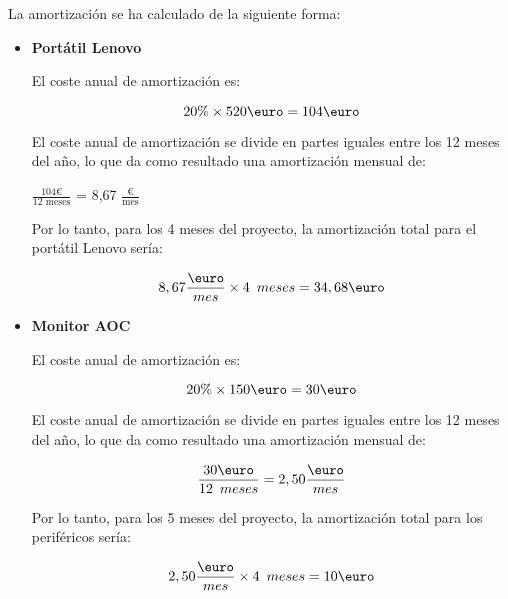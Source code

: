 \begin{itemize}
La amortización se ha calculado de la siguiente forma:
\begin{itemize}
    \item \textbf{Portátil Lenovo} 
    
El coste anual de amortización es: 
    \begin{center}
        $$ 20\% \times 520 \text{\euro} = 104 \text{\euro} $$
    \end{center}
    
El coste anual de amortización se divide en partes iguales entre los 12 meses del año, lo que da como resultado una amortización mensual de: 

    \begin{center}
       {\Large\(\frac{104\text{€}}{\text{12 meses}}\)} = 8,67 {\Large\(\frac{\text{€}}{\text{mes}}\)}
    \end{center}

Por lo tanto, para los 4 meses del proyecto, la amortización total para el portátil Lenovo sería: 

    \begin{center}
        $$ 8,67\frac{\text{\euro}}{mes}\times4\hspace{0.5em}meses=34,68\text{\euro}  $$
    \end{center}

    \item \textbf{Monitor AOC} 

    El coste anual de amortización es: 

    \begin{center}
        $$ 20\% \times 150 \text{\euro} = 30 \text{\euro} $$
    \end{center}
    
    El coste anual de amortización se divide en partes iguales entre los 12 meses del año, lo que da como resultado una amortización mensual de: 

    \begin{center}
        $$ \frac{30 \text{\euro}}{12 \hspace{0.5em}meses}=2,50\frac{\text{\euro}}{mes}  $$
    \end{center}

    Por lo tanto, para los 5 meses del proyecto, la amortización total para los periféricos sería: 

    \begin{center}
        $$ 2,50\frac{\text{\euro}}{mes}\times4\hspace{0.5em}meses=10\text{\euro}  $$
    \end{center}


\end{itemize}
\end{itemize}
